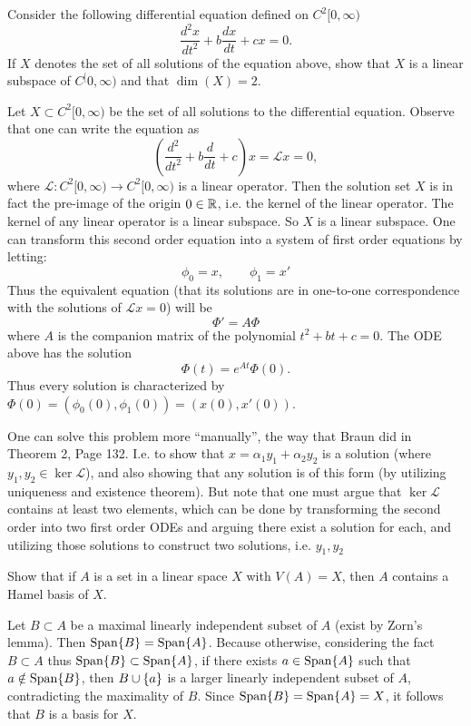 \begin{problem}
	Consider the following differential equation defined on $ C^2[0,\infty) $
	\[ \frac{d^2x}{dt^2} + b\frac{dx}{dt} + cx = 0. \]
	If $ X $ denotes the set of all solutions of the equation above, show that $ X $ is a linear subspace of $ C^[0,\infty) $ and that $ \dim(X) = 2 $.
\end{problem}
\begin{solution}
	Let $ X \subset C^2[0,\infty) $ be the set of all solutions to the differential equation. Observe that one can write the equation as
	\[ (\frac{d^2}{dt^2} + b\frac{d}{dt} + c)x = \mathcal{L}x = 0, \]
	where $ \mathcal{L}: C^2[0,\infty) \to C^2[0,\infty) $ is a linear operator. Then the solution set $ X $ is in fact the pre-image of the origin $ 0\in \mathbb{R} $, i.e. the kernel of the linear operator. The kernel of any linear operator is a linear subspace. So $ X $ is a linear subspace. One can transform this second order equation into a system of first order equations by letting:
	\[ \phi_0 = x, \qquad \phi_1 = x' \]
	Thus the equivalent equation (that its solutions are in one-to-one correspondence with the solutions of $ \mathcal{L}x=0 $) will be
	\[ \Phi' = A\Phi \]
	where $ A $ is the companion matrix of the polynomial $ t^2 + bt+c = 0 $. The ODE above has the solution
	\[ \Phi(t) = e^{At} \Phi(0). \]
	Thus every solution is characterized by $ \Phi(0) = (\phi_0(0),\phi_1(0)) = (x(0),x'(0)) $.
\end{solution}
\begin{remark}
	One can solve this problem more ``manually'', the way that Braun did in Theorem 2, Page 132. I.e. to show that $ x = \alpha_1 y_1 + \alpha_2 y_2$ is a solution (where $ y_1,y_2 \in \ker \mathcal{L} $), and also showing that any solution is of this form (by utilizing uniqueness and existence theorem). But note that one must argue that $ \ker \mathcal{L} $ contains at least two elements, which can be done by transforming the second order into two first order ODEs and arguing there exist a solution for each, and utilizing those solutions to construct two solutions, i.e. $ y_1, y_2 $
\end{remark}


\begin{problem}
	Show that if $ A $ is a set in a linear space $ X $ with $ V(A) = X $, then $ A $ contains a Hamel basis of $ X $.
\end{problem}
\begin{solution}
	Let $ B \subset A $ be a maximal linearly independent subset of $ A $ (exist by Zorn's lemma). Then $ \operatorname{Span}\{B\} = \operatorname{Span}\{A\} $. Because otherwise, considering the fact $ B\subset A $ thus $ \operatorname{Span}\{B\} \subset \operatorname{Span}\{A\} $, if there exists $ a \in \operatorname{Span}\{A\} $ such that $ a\notin \operatorname{Span}\{B\} $, then $ B\cup \{a\} $ is a larger linearly independent subset of $ A $, contradicting the maximality of $ B $. Since $ \operatorname{Span}\{B\} = \operatorname{Span}\{A\} = X $, it follows that $ B $ is a basis for $ X $.
\end{solution}


